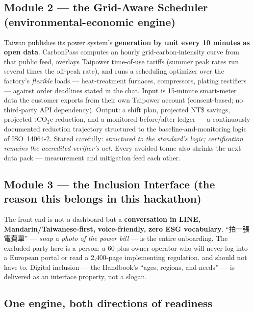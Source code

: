\subsection{Module 2 --- the Grid-Aware Scheduler (environmental-economic engine)}

Taiwan publishes its power system's \textbf{generation by unit every 10 minutes
as open data}\cite{taipowerdata}. CarbonPass computes an hourly
grid-carbon-intensity curve from that public feed, overlays Taipower
time-of-use tariffs (summer peak rates run several times the off-peak
rate\cite{taipower}), and runs a scheduling optimizer over the factory's
\emph{flexible} loads --- heat-treatment furnaces, compressors, plating
rectifiers --- against order deadlines stated in the chat. Input is 15-minute
smart-meter data the customer exports from their own Taipower account
(consent-based; no third-party API dependency). Output: a shift plan, projected
NT\$ savings, projected tCO$_2$e reduction, and a monitored before/after ledger
--- a continuously documented reduction trajectory structured to the
baseline-and-monitoring logic of ISO~14064-2. Stated carefully:
\emph{structured to the standard's logic; certification remains the accredited
verifier's act.} Every avoided tonne also shrinks the next data pack ---
measurement and mitigation feed each other.

\subsection{Module 3 --- the Inclusion Interface (the reason this belongs in this hackathon)}

The front end is not a dashboard but a \textbf{conversation in LINE,
Mandarin/Taiwanese-first, voice-friendly, zero ESG vocabulary}.
``{\cjk 拍一張電費單}'' --- \emph{snap a photo of the power bill} --- is the
entire onboarding. The excluded party here is a person: a 60-plus
owner-operator who will never log into a European portal or read a 2,400-page
implementing regulation\cite{omm}, and should not have to. Digital inclusion
--- the Handbook's ``ages, regions, and needs'' --- is delivered as an
interface property, not a slogan.

\subsection{One engine, both directions of readiness}


